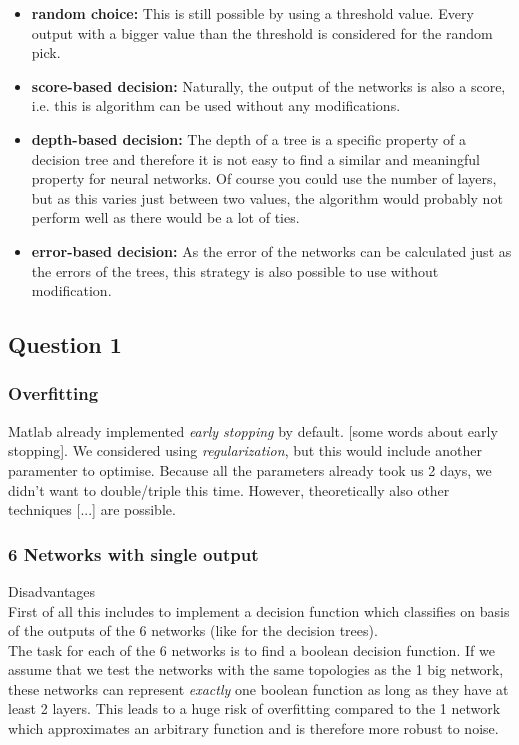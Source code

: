 \documentclass{article}
\begin{document}
\begin{itemize}
    \item \textbf{random choice:} This is still possible by using a threshold value. Every output with a bigger value than the threshold is considered for the random pick.
    \item \textbf{score-based decision:} Naturally, the output of the networks is also a score, i.e. this is algorithm can be used without any modifications.
    \item \textbf{depth-based decision:} The depth of a tree is a specific property of a decision tree and therefore it is not easy to find a similar and meaningful property for neural networks. Of course you could use the number of layers, but as this varies just between two values, the algorithm would probably not perform well as there would be a lot of ties.
    \item \textbf{error-based decision:} As the error of the networks can be calculated just as the errors of the trees, this strategy is also possible to use without modification.
\end{itemize}


\subsection{Question 1}

\subsubsection{Overfitting}
Matlab already implemented \emph{early stopping} by default. [some words about early stopping]. We considered using \emph{regularization}, but this would include another paramenter to optimise. Because all the parameters already took us 2 days, we didn't want to double/triple this time. However, theoretically also other techniques [...] are possible.

\subsubsection{6 Networks with single output}
Disadvantages\\
First of all this includes to implement a decision function which classifies on basis of the outputs of the 6 networks (like for the decision trees).\\
The task for each of the 6 networks is to find a boolean decision function. If we assume that we test the networks with the same topologies as the 1 big network, these networks can represent \textit{exactly} one boolean function as long as they have at least 2 layers. This leads to a huge risk of overfitting compared to the 1 network which approximates an arbitrary function and is therefore more robust to noise.
\end{document}
